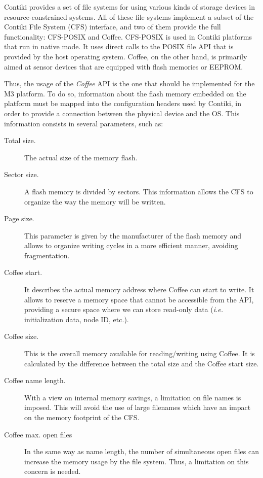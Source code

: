 \begin{citeverbatim}
	Contiki provides a set of file systems for using various kinds of storage devices in resource-constrained systems. 
	All of these file systems implement a subset of the Contiki File System (CFS) interface, and two of them provide the full functionality: CFS-POSIX and Coffee.
	CFS-POSIX is used in Contiki platforms that run in native mode. 
	It uses direct calls to the POSIX file API that is provided by the host operating system. 
	Coffee, on the other hand, is primarily aimed at sensor devices that are equipped with flash memories or EEPROM.
\end{citeverbatim}

Thus, the usage of the \textit{Coffee} API is the one that should be implemented for the M3 platform.
To do so, information about the flash memory embedded on the platform must be mapped into the configuration headers used by Contiki, in order to provide a connection between the physical device and the OS.
This information consists in several parameters, such as:
\begin{description}
	\item[Total size.] The actual size of the memory flash.
	\item[Sector size.] A flash memory is divided by sectors. This information allows the CFS to organize the way the memory will be written.
	\item[Page size.] This parameter is given by the manufacturer of the flash memory and allows to organize writing cycles in a more efficient manner, avoiding fragmentation.
	\item[Coffee start.] It describes the actual memory address where Coffee can start to write. It allows to reserve a memory space that cannot be accessible from the API, providing a secure space where we can store read-only data (\textit{i.e.} initialization data, node ID, etc.).
	\item[Coffee size.] This is the overall memory available for reading/writing using Coffee. It is calculated by the difference between the total size and the Coffee start size.
	\item[Coffee name length.] With a view on internal memory savings, a limitation on file names is imposed. This will avoid the use of large filenames which have an impact on the memory footprint of the CFS.
	\item[Coffee max. open files] In the same way as name length, the number of simultaneous open files can increase the memory usage by the file system. Thus, a limitation on this concern is needed.
\end{description}

